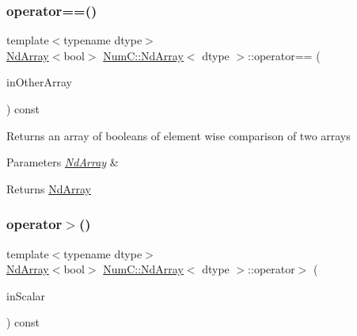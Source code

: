 \subsubsection{\texorpdfstring{operator==()}{operator==()}\hspace{0.1cm}{\footnotesize\ttfamily [2/2]}}
{\footnotesize\ttfamily template$<$typename dtype$>$ \\
\mbox{\hyperlink{class_num_c_1_1_nd_array}{Nd\+Array}}$<$bool$>$ \mbox{\hyperlink{class_num_c_1_1_nd_array}{Num\+C\+::\+Nd\+Array}}$<$ dtype $>$\+::operator== (\begin{DoxyParamCaption}\item[{const \mbox{\hyperlink{class_num_c_1_1_nd_array}{Nd\+Array}}$<$ dtype $>$ \&}]{in\+Other\+Array }\end{DoxyParamCaption}) const\hspace{0.3cm}{\ttfamily [inline]}}

Returns an array of booleans of element wise comparison of two arrays


\begin{DoxyParams}{Parameters}
{\em \mbox{\hyperlink{class_num_c_1_1_nd_array}{Nd\+Array}}} & \\
\hline
\end{DoxyParams}
\begin{DoxyReturn}{Returns}
\mbox{\hyperlink{class_num_c_1_1_nd_array}{Nd\+Array}} 
\end{DoxyReturn}
\mbox{\label{class_num_c_1_1_nd_array_aa00a43e8341f4322f182619f83e7a64c}} 
\subsubsection{\texorpdfstring{operator$>$()}{operator>()}\hspace{0.1cm}{\footnotesize\ttfamily [1/2]}}
{\footnotesize\ttfamily template$<$typename dtype$>$ \\
\mbox{\hyperlink{class_num_c_1_1_nd_array}{Nd\+Array}}$<$bool$>$ \mbox{\hyperlink{class_num_c_1_1_nd_array}{Num\+C\+::\+Nd\+Array}}$<$ dtype $>$\+::operator$>$ (\begin{DoxyParamCaption}\item[{dtype}]{in\+Scalar }\end{DoxyParamCaption}) const\hspace{0.3cm}{\ttfamily [inline]}}

